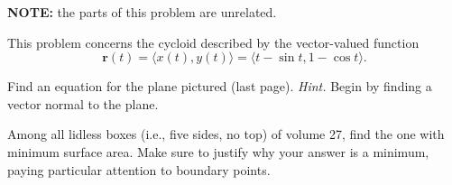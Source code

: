 \documentclass[12pt]{exam}
\renewcommand{\vec}[1]{\mathbf{#1}}
\begin{document}
\begin{questions}
    \question[16] \textbf{NOTE:} the parts of this problem are unrelated.

    \question This problem concerns the cycloid described by the vector-valued function
    \[
        \vec{r}(t) = \langle x(t), y(t) \rangle = \langle t - \sin t, 1 - \cos t \rangle.
    \]


    \question[16] \label{prob:planepic}
        Find an equation for the plane pictured (last page). \emph{Hint.} Begin by finding a vector normal to the plane.
        
   \question[16]
        Among all lidless boxes (i.e., five sides, no top) of volume 27, find the one with minimum surface area. Make sure to justify why your answer is a minimum, paying particular attention to boundary points.


\end{questions}
\end{document}

